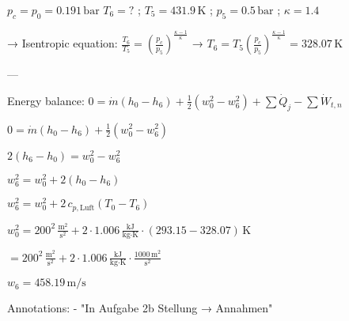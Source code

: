\( p_c = p_0 = 0.191 \, \text{bar} \)  
\( T_6 = ? \) ; \( T_5 = 431.9 \, \text{K} \) ; \( p_5 = 0.5 \, \text{bar} \) ; \( \kappa = 1.4 \)  

→ Isentropic equation:  
\( \frac{T_6}{T_5} = \left( \frac{p_c}{p_5} \right)^{\frac{\kappa - 1}{\kappa}} \) → \( T_6 = T_5 \left( \frac{p_c}{p_5} \right)^{\frac{\kappa - 1}{\kappa}} = 328.07 \, \text{K} \)  

---

Energy balance:  
\( 0 = \dot{m} \left( h_0 - h_6 \right) + \frac{1}{2} \left( w_0^2 - w_6^2 \right) + \sum \dot{Q}_j - \sum \dot{W}_{t,n} \)  

\( 0 = \dot{m} \left( h_0 - h_6 \right) + \frac{1}{2} \left( w_0^2 - w_6^2 \right) \)  

\( 2 \left( h_6 - h_0 \right) = w_0^2 - w_6^2 \)  

\( w_6^2 = w_0^2 + 2 \left( h_0 - h_6 \right) \)  

\( w_6^2 = w_0^2 + 2 \, c_{p,\text{Luft}} \left( T_0 - T_6 \right) \)  

\( w_0^2 = 200^2 \, \frac{\text{m}^2}{\text{s}^2} + 2 \cdot 1.006 \, \frac{\text{kJ}}{\text{kg} \cdot \text{K}} \cdot \left( 293.15 - 328.07 \right) \, \text{K} \)  

\( = 200^2 \, \frac{\text{m}^2}{\text{s}^2} + 2 \cdot 1.006 \, \frac{\text{kJ}}{\text{kg} \cdot \text{K}} \cdot \frac{1000 \, \text{m}^2}{\text{s}^2} \)  

\( w_6 = 458.19 \, \text{m/s} \)  

Annotations:  
- "In Aufgabe 2b Stellung → Annahmen"